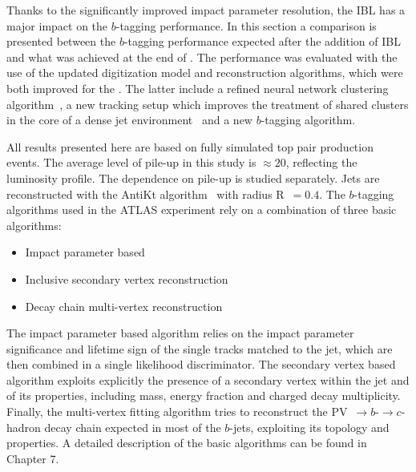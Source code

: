 Thanks to the significantly improved impact parameter resolution, the IBL has a major impact on the $b$-tagging performance. In this section a comparison is presented between the $b$-tagging performance expected after the addition of IBL and what was achieved at the end of \runone.
The performance was evaluated with the use of the updated digitization model and reconstruction algorithms, which were both improved for the \runtwo.
The latter include a refined neural network clustering algorithm~\cite{Aad:2014yva}, a new tracking setup which improves the treatment of shared clusters in the core of a dense jet environment~\cite{ATL-PHYS-PUB-2015-006} and a new $b$-tagging algorithm.

All results presented here are based on fully simulated top pair production events. The average level of pile-up in this study is $\approx 20$, reflecting the \runone luminosity profile. The dependence on pile-up is studied separately. Jets are reconstructed with the AntiKt algorithm~\cite{AntiKt} with radius R~$=0.4$. The $b$-tagging algorithms used in the ATLAS experiment rely on a combination of three basic algorithms:
\begin{itemize}
\item{Impact parameter based}
\item{Inclusive secondary vertex reconstruction}
\item{Decay chain multi-vertex reconstruction}
\end{itemize}
The impact parameter based algorithm relies on the impact parameter significance and lifetime sign of the single tracks matched to the jet, which are then combined in a single likelihood discriminator. The secondary vertex based algorithm exploits explicitly the presence of a secondary vertex within the jet and of its properties, including mass, energy fraction and charged decay multiplicity. Finally, the multi-vertex fitting algorithm tries to reconstruct the PV~$\to b$-$\to c$-hadron decay chain expected in most of the $b$-jets, exploiting its topology and properties. A detailed description of the basic algorithms can be found in Chapter 7.%

